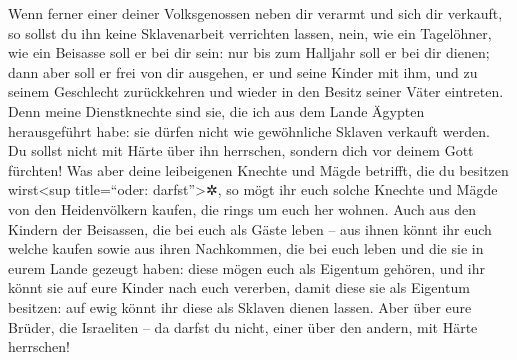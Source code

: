 Wenn ferner einer deiner Volksgenossen neben dir verarmt
und sich dir verkauft, so sollst du ihn keine Sklavenarbeit verrichten
lassen, nein, wie ein Tagelöhner, wie ein Beisasse soll
er bei dir sein: nur bis zum Halljahr soll er bei dir dienen;
dann aber soll er frei von dir ausgehen, er und seine
Kinder mit ihm, und zu seinem Geschlecht zurückkehren und wieder in den
Besitz seiner Väter eintreten. Denn meine Dienstknechte
sind sie, die ich aus dem Lande Ägypten herausgeführt habe: sie dürfen
nicht wie gewöhnliche Sklaven verkauft werden. Du sollst
nicht mit Härte über ihn herrschen, sondern dich vor deinem Gott
fürchten! Was aber deine leibeigenen Knechte und Mägde
betrifft, die du besitzen wirst\textless sup title=``oder:
darfst''\textgreater✲, so mögt ihr euch solche Knechte und Mägde von den
Heidenvölkern kaufen, die rings um euch her wohnen. Auch
aus den Kindern der Beisassen, die bei euch als Gäste leben -- aus ihnen
könnt ihr euch welche kaufen sowie aus ihren Nachkommen, die bei euch
leben und die sie in eurem Lande gezeugt haben: diese mögen euch als
Eigentum gehören, und ihr könnt sie auf eure Kinder nach
euch vererben, damit diese sie als Eigentum besitzen: auf ewig könnt ihr
diese als Sklaven dienen lassen. Aber über eure Brüder, die Israeliten
-- da darfst du nicht, einer über den andern, mit Härte herrschen!

